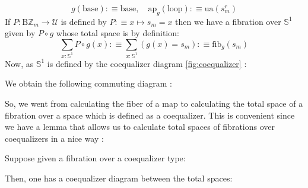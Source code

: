\documentclass{report}
\begin{document}
$$g(\mathrm{base}) :\equiv \mathrm{base}, \quad \mathrm{ap}_g(\mathrm{loop}) :\equiv \mathrm{ua}(s_m^r)$$
If $P : \mathrm{B}\mathbb{Z}_m \rightarrow \mathcal{U}$ is defined by $P :\equiv x \mapsto s_m = x$ then we have a fibration over $\mathbb{S}^1$ given by $P \circ g$ whose total space is by definition:
$$\sum_{x : \mathbb{S}^1} P \circ g (x) :\equiv \sum_{x : \mathbb{S}^1}(g(x)=s_m) :\equiv \mathrm{fib}_g(s_m)$$ 
Now, as $\mathbb{S}^1$ is defined by the coequalizer diagram \ref{fig:coequalizer} :
\begin{center}
\end{center}
We obtain the following commuting diagram : 
\begin{center}
\end{center}
So, we went from calculating the fiber of a map to calculating the total space of a fibration over a space which is defined as a coequalizer. This is convenient since we have a lemma that allows us to calculate total spaces of fibrations over coequalizers in a nice way : 
\begin{prop}
  Suppose given a fibration over a coequalizer type: 
  \begin{center}
  \end{center}
  Then, one has a coequalizer diagram between the total spaces: 
  \begin{center}
  \end{center}
\end{prop}
\end{document}
